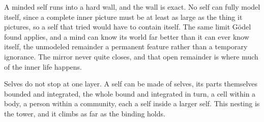 A minded self runs into a hard wall, and the wall is exact. No self can fully model itself, since a complete inner picture must be at least as large as the thing it pictures, so a self that tried would have to contain itself. The same limit Gödel found applies, and a mind can know its world far better than it can ever know itself, the unmodeled remainder a permanent feature rather than a temporary ignorance. The mirror never quite closes, and that open remainder is where much of the inner life happens.

Selves do not stop at one layer. A self can be made of selves, its parts themselves bounded and integrated, the whole bound and integrated in turn, a cell within a body, a person within a community, each a self inside a larger self. This nesting is the tower, and it climbs as far as the binding holds.
